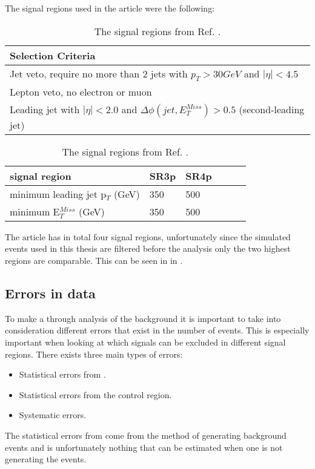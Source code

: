 The signal regions used in the article were the following:
\begin{table}[h]
\begin{center}
\begin{tabular}{l}
\hline
Selection Criteria \\ \hline
Jet veto, require no more than 2 jets with $p_T > 30 GeV$ and $|\eta| < 4.5$ \\
Lepton veto, no electron or muon \\
Leading jet with $|\eta| < 2.0$ and $\Delta \phi (jet, E_T^{Miss})>0.5$ (second-leading jet) \\ \hline
\end{tabular}
\begin{tabular}{l l l l l l}
signal region & SR3p & SR4p \\ \hline
minimum leading jet p$_T$ (GeV) & 350 & 500 \\
minimum E$^{Miss}_T$ (GeV) & 350 & 500 \\ \hline
\end{tabular}
\label{tab:oldsr}
\caption{The signal regions from Ref. \citep{ATLAS-CONF-2012-147}.}
\end{center}
\end{table}

The article \citep{ATLAS-CONF-2012-147} has in total four signal regions, unfortunately since the simulated events used in this thesis are filtered before the analysis only the two highest regions are comparable. This can be seen in  in .

\subsection{Errors in data}\label{subsec:errdata}
To make a through analysis of the background it is important to take into consideration different errors that exist in the number of events. This is especially important when looking at which signals can be excluded in different signal regions.
There exists three main types of errors:
\begin{itemize}
\item Statistical errors from \abbrMC.
\item Statistical errors from the control region. 
\item Systematic errors.
\end{itemize}
The statistical errors from \abbrMC come from the method of generating background events and is unfortunately nothing that can be estimated when one is not generating the events. 

